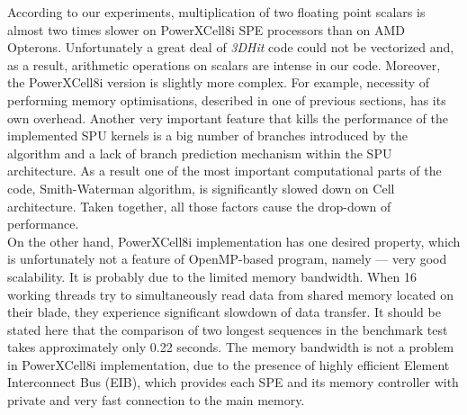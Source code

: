 \documentclass[envcountsame,envcountchap]{svmono}
\newcommand{\prog}{\emph{3DHit}}
\begin{document}
According to our experiments, multiplication of two floating point scalars is
almost two times slower on PowerXCell8i SPE processors than on AMD Opterons.
Unfortunately a great deal of \prog{} code could not be vectorized and, as a
result, arithmetic operations on scalars are intense in our code.
Moreover, the PowerXCell8i version is slightly more complex.
For example, necessity of performing memory optimisations, described in one of
previous sections, has its own overhead.
Another very important feature that kills the performance of the implemented SPU
kernels is a big number of branches introduced by the algorithm and a lack of
branch prediction mechanism within the SPU architecture.
As a result one of the most important computational parts of the code,
Smith-Waterman algorithm, is significantly slowed down on Cell architecture.
Taken together, all those factors cause the drop-down of performance.\\
On the other hand, PowerXCell8i implementation has one desired property, which
is unfortunately not a feature of OpenMP-based program, namely --- very good
scalability.
It is probably due to the limited memory bandwidth.
When 16 working threads try to simultaneously read data from shared memory
located on their blade, they experience significant slowdown of data
transfer.
It should be stated here that the comparison of two longest sequences in the
benchmark test takes approximately only 0.22 seconds.
The memory bandwidth  is not a problem in PowerXCell8i implementation, due to
the presence of highly efficient Element Interconnect Bus (EIB), which provides
each SPE and its memory controller with private and very fast connection to the
main memory.

\end{document}
